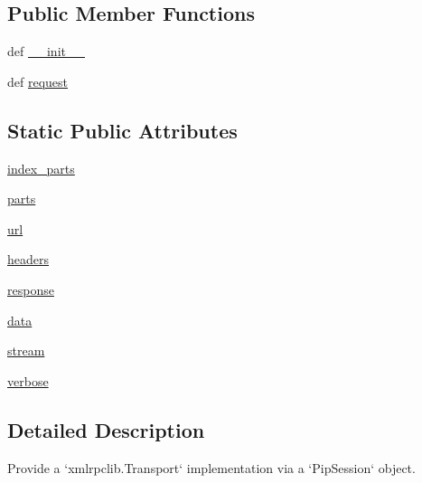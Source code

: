\subsection*{Public Member Functions}
\begin{DoxyCompactItemize}
\item 
def \hyperlink{classpip_1_1__internal_1_1network_1_1xmlrpc_1_1PipXmlrpcTransport_afd4821be0f546c764824cdf13c5dbfaf}{\+\_\+\+\_\+init\+\_\+\+\_\+}
\item 
def \hyperlink{classpip_1_1__internal_1_1network_1_1xmlrpc_1_1PipXmlrpcTransport_a506e02324321e058d110c79a5a9b3326}{request}
\end{DoxyCompactItemize}
\subsection*{Static Public Attributes}
\begin{DoxyCompactItemize}
\item 
\hyperlink{classpip_1_1__internal_1_1network_1_1xmlrpc_1_1PipXmlrpcTransport_a7dbde14103543735d8c31ec701ffd1ad}{index\+\_\+parts}
\item 
\hyperlink{classpip_1_1__internal_1_1network_1_1xmlrpc_1_1PipXmlrpcTransport_a22ad801dd0cbb88f488873e88f6a3e4a}{parts}
\item 
\hyperlink{classpip_1_1__internal_1_1network_1_1xmlrpc_1_1PipXmlrpcTransport_a89367e088a8d21b0a4de79bad7e4e6b1}{url}
\item 
\hyperlink{classpip_1_1__internal_1_1network_1_1xmlrpc_1_1PipXmlrpcTransport_a1c884688f8c10f83e4c81dbad856dbd6}{headers}
\item 
\hyperlink{classpip_1_1__internal_1_1network_1_1xmlrpc_1_1PipXmlrpcTransport_aa80c96fcfe8e03a5b8934499ca233679}{response}
\item 
\hyperlink{classpip_1_1__internal_1_1network_1_1xmlrpc_1_1PipXmlrpcTransport_a7d708c564d113e7d01ef09a43cbcdefd}{data}
\item 
\hyperlink{classpip_1_1__internal_1_1network_1_1xmlrpc_1_1PipXmlrpcTransport_ae1fb02b623d5b593f108d73535d45b37}{stream}
\item 
\hyperlink{classpip_1_1__internal_1_1network_1_1xmlrpc_1_1PipXmlrpcTransport_a76bd2c4fb3f21218c3fedc165f5fe726}{verbose}
\end{DoxyCompactItemize}


\subsection{Detailed Description}
\begin{DoxyVerb}Provide a `xmlrpclib.Transport` implementation via a `PipSession`
object.
\end{DoxyVerb}
 

